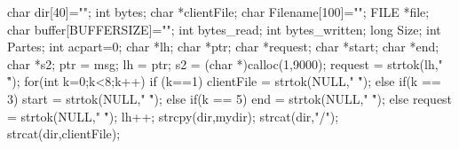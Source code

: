 \begin{DoxyCode}
                                              {
        
        char dir[40]="";
        int bytes;
        char *clientFile;
        char Filename[100]="";
        FILE *file;
        char buffer[BUFFERSIZE]="";
        int bytes_read;
        int bytes_written;
        long Size;
        int Partes;
        int acpart=0;
        char *lh;
        char *ptr;
        char *request;
        char *start;
        char *end;
        char *s2;
        ptr = msg;
        lh = ptr;
        s2 = (char *)calloc(1,9000);
        request = strtok(lh," \n\r");
        for(int k=0;k<8;k++){
                if (k==1){
                        clientFile = strtok(NULL," \n\r");
                } else if(k == 3){
                         start = strtok(NULL," \n\r");
                } else if(k == 5){
                        end = strtok(NULL," \n\r");
                }
                else{
                        request = strtok(NULL," \n\r");
                }
                lh++;
        }
        strcpy(dir,mydir);
        strcat(dir,"/");
        strcat(dir,clientFile);
        
}
\end{DoxyCode}
